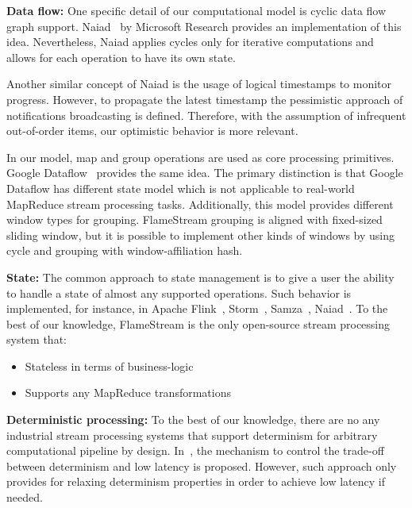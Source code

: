 
\label {fs-related-section}

{\bf Data flow:}
One specific detail of our computational model is cyclic data flow graph support. Naiad~\cite{Murray:2013:NTD:2517349.2522738} by Microsoft Research provides an implementation of this idea. Nevertheless, Naiad applies cycles only for iterative computations and allows for each operation to have its own state. 

Another similar concept of Naiad is the usage of logical timestamps to monitor progress. However, to propagate the latest timestamp the pessimistic approach of notifications broadcasting is defined. Therefore, with the assumption of infrequent out-of-order items, our optimistic behavior is more relevant.

In our model, map and group operations are used as core processing primitives. Google Dataflow~\cite{Akidau:2015:DMP:2824032.2824076} provides the same idea. The primary distinction is that Google Dataflow has different state model which is not applicable to real-world MapReduce stream processing tasks. Additionally, this model provides different window types for grouping. FlameStream grouping is aligned with fixed-sized sliding window, but it is possible to implement other kinds of windows by using cycle and grouping with window-affiliation hash.

{\bf State:}
The common approach to state management is to give a user the ability to handle a state of almost any supported operations. Such behavior is implemented, for instance, in Apache Flink~\cite{carbone2015apache}, Storm~\cite{apache:storm}, Samza~\cite{Noghabi:2017:SSS:3137765.3137770}, Naiad~\cite{Murray:2013:NTD:2517349.2522738}.
To the best of our knowledge, FlameStream is the only open-source stream processing system that:
\begin{itemize}
    \item Stateless in terms of business-logic
    \item Supports any MapReduce transformations 
\end{itemize}

{\bf Deterministic processing:}
To the best of our knowledge, there are no any industrial stream processing systems that support determinism for arbitrary computational pipeline by design. In~\cite{Zacheilas:2017:MDS:3093742.3093921}, the mechanism to control the trade-off between determinism and low latency is proposed. However, such approach only provides for relaxing determinism properties in order to achieve low latency if needed.

